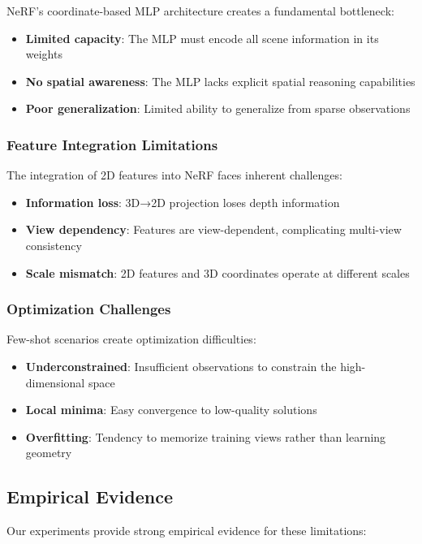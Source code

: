 \documentclass[11pt]{article}
\begin{document}
NeRF's coordinate-based MLP architecture creates a fundamental bottleneck:
\begin{itemize}
    \item \textbf{Limited capacity}: The MLP must encode all scene information in its weights
    \item \textbf{No spatial awareness}: The MLP lacks explicit spatial reasoning capabilities
    \item \textbf{Poor generalization}: Limited ability to generalize from sparse observations
\end{itemize}

\subsubsection{Feature Integration Limitations}

The integration of 2D features into NeRF faces inherent challenges:
\begin{itemize}
    \item \textbf{Information loss}: 3D→2D projection loses depth information
    \item \textbf{View dependency}: Features are view-dependent, complicating multi-view consistency
    \item \textbf{Scale mismatch}: 2D features and 3D coordinates operate at different scales
\end{itemize}

\subsubsection{Optimization Challenges}

Few-shot scenarios create optimization difficulties:
\begin{itemize}
    \item \textbf{Underconstrained}: Insufficient observations to constrain the high-dimensional space
    \item \textbf{Local minima}: Easy convergence to low-quality solutions
    \item \textbf{Overfitting}: Tendency to memorize training views rather than learning geometry
\end{itemize}

\subsection{Empirical Evidence}

Our experiments provide strong empirical evidence for these limitations:
\end{document}
